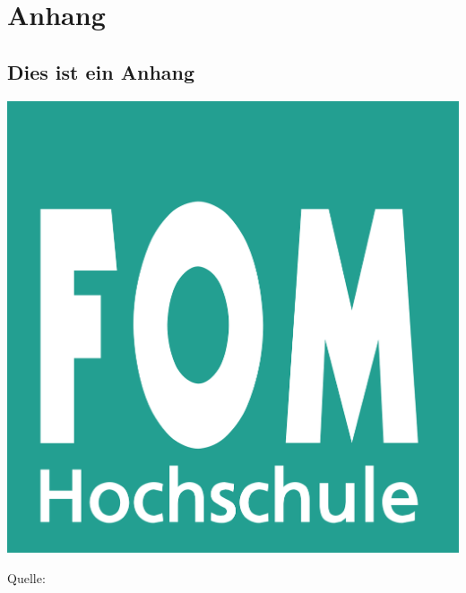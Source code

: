 \chapter*{Anhang}
\renewcommand\thesection{Anhang \arabic{section}:} %

\begin{minipage}{\textwidth}
	\section{Dies ist ein Anhang}
	\label{anh:beispiel}
	\includegraphics[width=0.5\linewidth]{Abbildungen/fom_logo.png} 
	\par\smallskip
	Quelle: \cite{logo}
\end{minipage}

\renewcommand\thesection{\thechapter.\arabic{section}}